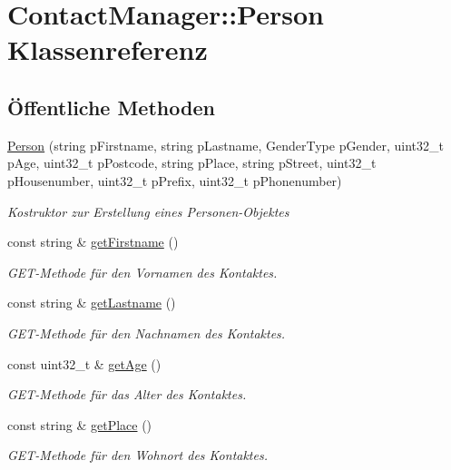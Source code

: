 \hypertarget{classContactManager_1_1Person}{}\section{Contact\+Manager\+:\+:Person Klassenreferenz}
\label{classContactManager_1_1Person}
\subsection*{Öffentliche Methoden}
\begin{DoxyCompactItemize}
\item 
\hyperlink{classContactManager_1_1Person_ab1082b4e670d792fa0e7089a1834f2a2}{Person} (string p\+Firstname, string p\+Lastname, Gender\+Type p\+Gender, uint32\+\_\+t p\+Age, uint32\+\_\+t p\+Postcode, string p\+Place, string p\+Street, uint32\+\_\+t p\+Housenumber, uint32\+\_\+t p\+Prefix, uint32\+\_\+t p\+Phonenumber)
\begin{DoxyCompactList}\small\item\em Kostruktor zur Erstellung eines Personen-\/\+Objektes\end{DoxyCompactList}\item 
const string \& \hyperlink{classContactManager_1_1Person_a22614abf3860a8a1232b12477b91fd86}{get\+Firstname} ()
\begin{DoxyCompactList}\small\item\em G\+E\+T-\/\+Methode für den Vornamen des Kontaktes.\end{DoxyCompactList}\item 
const string \& \hyperlink{classContactManager_1_1Person_afc0fffbd413c5767998772af068a1230}{get\+Lastname} ()
\begin{DoxyCompactList}\small\item\em G\+E\+T-\/\+Methode für den Nachnamen des Kontaktes.\end{DoxyCompactList}\item 
const uint32\+\_\+t \& \hyperlink{classContactManager_1_1Person_ad311ea106906c881d4659d37db460c80}{get\+Age} ()
\begin{DoxyCompactList}\small\item\em G\+E\+T-\/\+Methode für das Alter des Kontaktes.\end{DoxyCompactList}\item 
const string \& \hyperlink{classContactManager_1_1Person_a27adc1676f898aeadf2e372f0d158715}{get\+Place} ()
\begin{DoxyCompactList}\small\item\em G\+E\+T-\/\+Methode für den Wohnort des Kontaktes.\end{DoxyCompactList}\item 

\end{DoxyCompactItemize}
